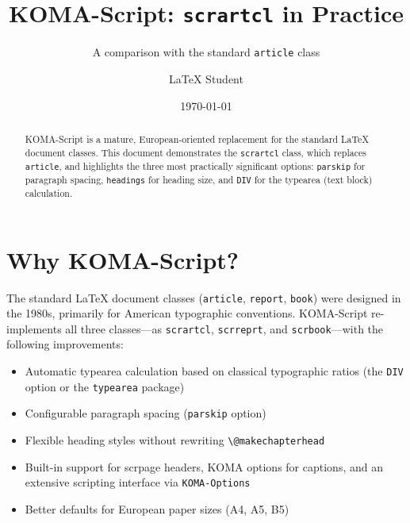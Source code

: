 \documentclass[
    12pt,               %
    a4paper,            %
    parskip=half,       %
    headings=small,     %
    DIV=12              %
]{scrartcl}
\subtitle{A comparison with the standard \texttt{article} class}
\title{KOMA-Script: \texttt{scrartcl} in Practice}
\author{LaTeX Student}
\date{\today}
\begin{document}
\maketitle


\begin{abstract}
KOMA-Script is a mature, European-oriented replacement for the standard
\LaTeX{} document classes. This document demonstrates the \texttt{scrartcl}
class, which replaces \texttt{article}, and highlights the three most
practically significant options: \texttt{parskip} for paragraph spacing,
\texttt{headings} for heading size, and \texttt{DIV} for the typearea
(text block) calculation.
\end{abstract}

\tableofcontents


\section{Why KOMA-Script?}
\label{sec:motivation}

The standard \LaTeX{} document classes (\texttt{article}, \texttt{report},
\texttt{book}) were designed in the 1980s, primarily for American typographic
conventions. KOMA-Script re-implements all three classes—as \texttt{scrartcl},
\texttt{scrreprt}, and \texttt{scrbook}—with the following improvements:

\begin{itemize}
    \item Automatic typearea calculation based on classical typographic ratios
          (the \texttt{DIV} option or the \texttt{typearea} package)
    \item Configurable paragraph spacing (\texttt{parskip} option)
    \item Flexible heading styles without rewriting \verb|\@makechapterhead|
    \item Built-in support for scrpage headers, KOMA options for captions,
          and an extensive scripting interface via \texttt{KOMA-Options}
    \item Better defaults for European paper sizes (A4, A5, B5)
\end{itemize}
\end{document}
